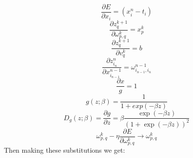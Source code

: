 \documentclass{amsart}
\begin{document}
%
\begin{equation*}
\frac{\partial E}{\partial x_i} = (x_i^n - t_i)
\end{equation*}
%
\begin{equation*}
\frac{\partial z_q^{k+1}}{\partial \omega_{p,q}^k} = x_p^k
\end{equation*}
%
\begin{equation*}
\frac{\partial z_q^{k+1}}{\partial v_q^k} = b
\end{equation*}
%
\begin{equation*}
\frac{\partial z_{i_n}^{n}}{\partial x_{i_{n-1}}^{n-1}} = \omega_{i_{n-1},i_n}^{n-1}
\end{equation*}
%
\begin{equation*}
\frac{\partial x}{g} = 1
\end{equation*}
%
\begin{equation*}
g(z;\beta) = \frac{1}{1 + exp(-\beta z )}
\end{equation*}
%
\begin{equation*}
D_g(z;\beta) = \frac{\partial g}{\partial z} = \beta \frac{\exp(-\beta z)}{(1 + \exp(-\beta z))^2}
\end{equation*}
%
\begin{equation*}
\omega_{p,q}^k - \eta \frac{\partial E}{\partial \omega_{p,q}^k} \rightarrow \omega_{p,q}^k
\end{equation*}
%
Then making these substitutions we get:
\end{document}
